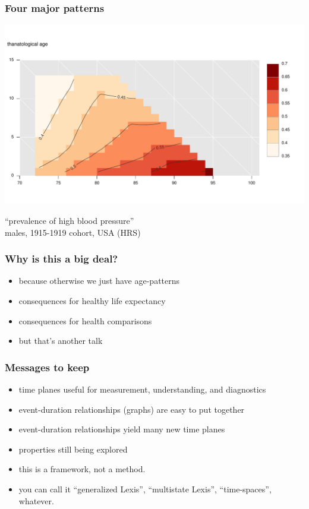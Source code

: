 \documentclass[20pt]{beamer}
\begin{document}
\begin{frame}
\frametitle{Four major patterns}
\begin{centering}
\includegraphics[scale=.95]{Figures/Figure4b.pdf}\\
\end{centering}
``prevalence of high blood pressure''\\
males, 1915-1919 cohort, USA (HRS)
\end{frame}

\begin{frame}
\frametitle{Why is this a big deal?}
\begin{itemize}[<+->]
  \item because otherwise we just have age-patterns
  \item consequences for healthy life expectancy
  \item consequences for health comparisons
  \item but that's another talk
\end{itemize}
\end{frame}

\begin{frame}
\frametitle{Messages to keep}
\begin{itemize}[<+->]
  \item time planes useful for measurement, understanding, and diagnostics
  \item event-duration relationships (graphs) are easy to put together
  \item event-duration relationships yield many new time planes
  \item properties still being explored
  \item this is a framework, not a method. 
  \item you can call it ``generalized Lexis'', ``multistate Lexis'',
  ``time-spaces'', whatever.
\end{itemize}
\end{frame}
\end{document}
